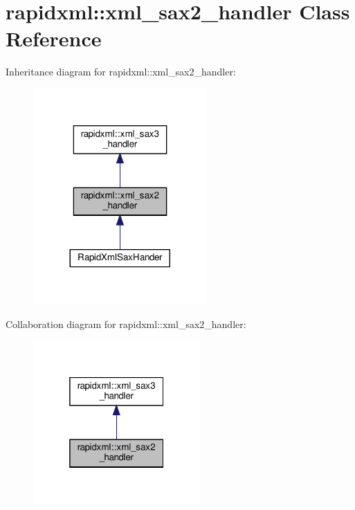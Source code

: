\hypertarget{classrapidxml_1_1xml__sax2__handler}{}\section{rapidxml\+:\+:xml\+\_\+sax2\+\_\+handler Class Reference}
\label{classrapidxml_1_1xml__sax2__handler}


Inheritance diagram for rapidxml\+:\+:xml\+\_\+sax2\+\_\+handler\+:
\nopagebreak
\begin{figure}[H]
\begin{center}
\leavevmode
\includegraphics[width=188pt]{classrapidxml_1_1xml__sax2__handler__inherit__graph}
\end{center}
\end{figure}


Collaboration diagram for rapidxml\+:\+:xml\+\_\+sax2\+\_\+handler\+:
\nopagebreak
\begin{figure}[H]
\begin{center}
\leavevmode
\includegraphics[width=181pt]{classrapidxml_1_1xml__sax2__handler__coll__graph}
\end{center}
\end{figure}
